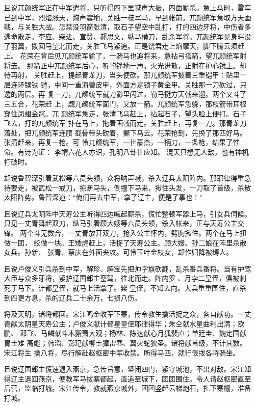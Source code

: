 且说兀颜统军正在中军遣将，只听得四下里喊声大振，四面厮杀。急上马时，雷车
已到中军，烈焰涨天，炮声震地，关胜一枝军马，早到帐前。兀颜统军急取方天画
戟，与关胜大战。怎禁没羽箭张清，取石子望空中乱打，打的四边牙将，中伤者多
逃命散走。李应、柴进、宣赞、郝思文，纵马横刀，乱杀军将。兀颜统军见身畔没
了羽翼，拨回马望北而走，关胜飞马紧追。正是饶君走上焰摩天，脚下腾云须赶上。
花荣在背后见兀颜统军输了，一骑马也追将来，急拈弓搭箭，望兀颜统军射将去。
那箭正中兀颜统军后心，听的铮地一声，火光迸散，正射在护心镜上。却待再射，
关胜赶上，提起青龙刀，当头便砍。那兀颜统军披着三重铠甲：贴里一层连环镔铁
铠，中间一重海兽皮甲，外面方是锁子黄金甲。关胜那一刀砍过，只透的两层。再
复一刀，兀颜统军就刀影里闪过，勒马挺方天戟来迎。两个又斗了三五合，花荣赶
上，觑兀颜统军面门，又放一箭。兀颜统军急躲，那枝箭带耳根穿住凤翅金冠。兀
颜统军急走，张清飞马赶上，拈起石子，望头脸上便打。石子飞去，打的兀颜统军
扑在马上，拖着画戟而走。关胜赶上，再复一刀。那青龙刀落处，把兀颜统军连腰
截骨带头砍着，攧下马去。花荣抢到，先换了那匹好马。张清赶来，再复一枪。可
怜兀颜统军，一世豪杰，一柄刀，一条枪，结果了性命。有诗为证：
李靖六花人亦识，孔明八卦世应知。
混天只想无人敌，也有神机打破时。

却说鲁智深引着武松等六员头领，众将呐声喊，杀入辽兵太阳阵内。那耶律得重急
待要走，被武松一戒刀，掠断马头，倒撞下马来，揪住头发，一刀取了首级，杀散
太阳阵势。鲁智深道：“俺们再去中军，拿了辽主，便是了事也！”

且说辽兵太阴阵中天寿公主听得四边喊起厮杀，慌忙整顿军器上马，引女兵伺候。
只见一丈青舞起双刀，纵马引着顾大嫂等六员头领，杀入帐来，正与天寿公主交锋。
两个斗无数合，一丈青放开双刀，抢入公主怀内，劈胸揪住。两个在马上扭做一团，
绞做一块。王矮虎赶上，活捉了天寿公主。顾大嫂、孙二娘在阵里杀散女兵。孙新、
张青、蔡庆在外面夹攻。可怜玉叶金枝女，却作归降被缚人。

且说卢俊义引兵杀到中军，解珍、解宝先把帅字旗砍翻，乱杀番兵番将。当有护驾
大臣与众多牙将，紧护辽国郎主銮驾，往北而走。阵内罗、月孛二皇侄，俱被刺
死于马下。计都皇侄，就马上活拿了。紫皇侄，不知去向。大兵重重围住，直杀
到四更方息，杀的辽兵二十余万，七损八伤。

将及天明，诸将都回。宋江鸣金收军下寨，传令教生擒活捉之众，各自献功。一丈
青献太阴星天寿公主；卢俊义献计都星皇侄耶律得华；朱仝献水星曲利出清；欧鹏、
邓飞、马麟献斗木獬萧大观；杨林、陈达献心月狐裴直；单廷圭、魏定国献胃土雉
高彪；韩滔、彭玘献柳土獐雷春、翼火蛇狄圣。诸将献首级，不计其数。宋江将生
擒八将，尽行解赴赵枢密中军收禁。所得马匹，就行俵拨各将骑坐。

且说辽国郎主慌速退入燕京，急传旨意，坚闭四门，紧守城池，不出对敌。宋江知
得辽主退回燕京，便教军马拔寨都起，直追至城下，团团围住。令人请赵枢密直至
后营，监临打城。宋江传令，教就燕京城外，团团竖起云梯炮石，扎下寨栅，准备
打城。

